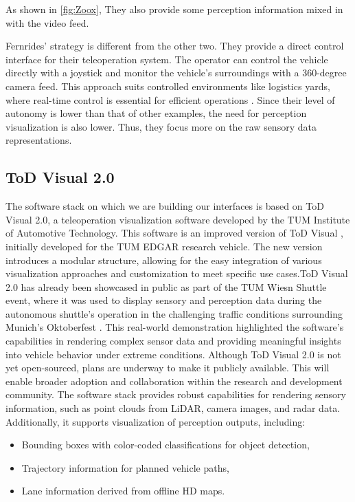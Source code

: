As shown in \ref{fig:Zoox}, They also provide some perception information mixed in with the video feed.

Fernrides' strategy is different from the other two. They provide a direct
control interface for their teleoperation system. The operator can control the vehicle directly with a joystick and monitor the vehicle's surroundings with a 360-degree camera feed. This approach suits controlled environments like logistics yards, where real-time control is essential for efficient operations \cite{fernride2023}. Since their level of autonomy is lower than that of other examples, the need for perception visualization is also lower. Thus, they focus more on the raw sensory data representations.

\subsection{ToD Visual 2.0}\label{subsection:todvisual}
The software stack on which we are building our interfaces is based on ToD Visual 2.0, a teleoperation visualization software developed by the TUM Institute of Automotive Technology. This software is an improved version of ToD Visual \cite{Schimpe}, initially developed for the TUM EDGAR research vehicle. The new version introduces a modular structure, allowing for the easy integration of various visualization approaches and customization to meet specific use cases.ToD Visual 2.0 has already been showcased in public as part of the TUM Wiesn Shuttle event, where it was used to display sensory and perception data during the autonomous shuttle's operation in the challenging traffic conditions surrounding Munich's Oktoberfest \cite{adac2024wiesn, tum2024wiesn}. This real-world demonstration highlighted the software's capabilities in rendering complex sensor data and providing meaningful insights into vehicle behavior under extreme conditions. Although ToD Visual 2.0 is not yet open-sourced, plans are underway to make it publicly available. This will enable broader adoption and collaboration within the research and development community. The software stack provides robust capabilities for rendering sensory information, such as point clouds from \ac{LiDAR}, camera images, and radar data. Additionally, it supports visualization of perception outputs, including:
\begin{itemize}
    \item Bounding boxes with color-coded classifications for object detection,
    \item Trajectory information for planned vehicle paths,
    \item Lane information derived from offline HD maps.
\end{itemize}

